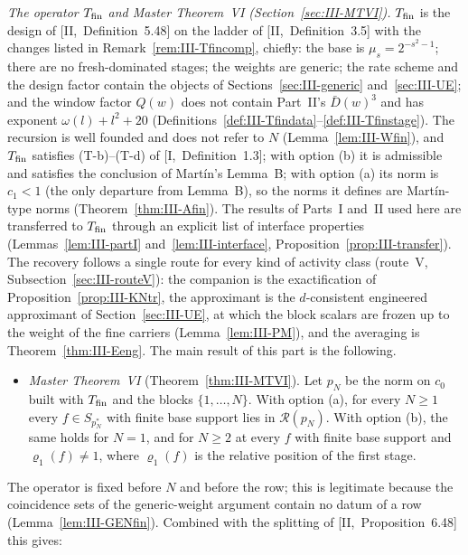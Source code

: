 \documentclass[10pt]{amsart}
\theoremstyle{definition}
\theoremstyle{remark}
\newcommand{\Rec}{\mathcal R}
\begin{document}
\emph{The operator $T_{\rm fin}$ and Master Theorem~VI
(Section~\ref{sec:III-MTVI}).}  $T_{\rm fin}$ is the design of
[II,~Definition~5.48] on the ladder of [II,~Definition~3.5] with the
changes listed in Remark~\ref{rem:III-Tfincomp}, chiefly: the base is
$\mu_s=2^{-s^2-1}$; there are no fresh-dominated stages; the weights are
generic; the rate scheme and the design factor contain the objects of
Sections~\ref{sec:III-generic} and~\ref{sec:III-UE}; and the window factor
$Q(w)$ does not contain Part~II's $\bar D(w)^3$ and has exponent
$\omega(l)+l^2+20$
(Definitions~\ref{def:III-Tfindata}--\ref{def:III-Tfinstage}).  The
recursion is well founded and does not refer to $N$
(Lemma~\ref{lem:III-Wfin}), and $T_{\rm fin}$ satisfies (T-b)--(T-d) of
[I,~Definition~1.3]; with option (b) it is admissible and satisfies the
conclusion of Mart\'in's Lemma~B; with option (a) its norm is $c_1<1$ (the
only departure from Lemma~B), so the norms it defines are Mart\'in-type
norms (Theorem~\ref{thm:III-Afin}).  The results of Parts~I and~II used here are
transferred to $T_{\rm fin}$ through an explicit list of interface
properties (Lemmas~\ref{lem:III-partI} and~\ref{lem:III-interface},
Proposition~\ref{prop:III-transfer}).  The recovery follows a single route
for every kind of activity class (route~V, Subsection~\ref{sec:III-routeV}):
the companion is the exactification of Proposition~\ref{prop:III-KNtr}, the
approximant is the $d$-consistent engineered approximant of
Section~\ref{sec:III-UE}, at which the block scalars are frozen up to the
weight of the fine carriers (Lemma~\ref{lem:III-PM}), and the averaging is
Theorem~\ref{thm:III-Eeng}.  The main result of this part is the following.

\begin{itemize}
\item[] \emph{Master Theorem~VI} (Theorem~\ref{thm:III-MTVI}).  Let $p_N$ be
the norm on $c_0$ built with $T_{\rm fin}$ and the blocks $\{1,\dots,N\}$.
With option \textup{(a)}, for every $N\ge1$ every $f\in S_{p_N^*}$ with
finite base support lies in $\Rec(p_N)$.  With option \textup{(b)}, the same
holds for $N=1$, and for $N\ge2$ at every $f$ with finite base support and
$\varrho_1(f)\ne1$, where $\varrho_1(f)$ is the relative position of the
first stage.
\end{itemize}

The operator is fixed before $N$ and before the row; this is legitimate
because the coincidence sets of the generic-weight argument contain no
datum of a row (Lemma~\ref{lem:III-GENfin}).  Combined with the splitting
of [II,~Proposition~6.48] this gives:
\end{document}
